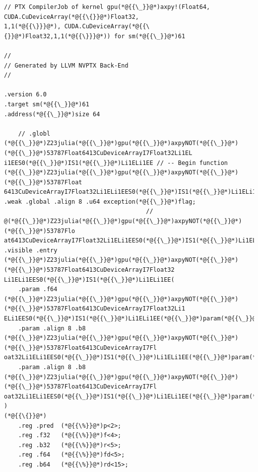 \documentclass[12pt,a4paper]{article}
\begin{document}
\begin{lstlisting}
// PTX CompilerJob of kernel gpu(*@{{\_}}@*)axpy!(Float64, CUDA.CuDeviceArray(*@{{\{}}@*)Float32,
1,1(*@{{\}}}@*), CUDA.CuDeviceArray(*@{{\{}}@*)Float32,1,1(*@{{\}}}@*)) for sm(*@{{\_}}@*)61

//
// Generated by LLVM NVPTX Back-End
//

.version 6.0
.target sm(*@{{\_}}@*)61
.address(*@{{\_}}@*)size 64

	// .globl	(*@{{\_}}@*)Z23julia(*@{{\_}}@*)gpu(*@{{\_}}@*)axpyNOT(*@{{\_}}@*)(*@{{\_}}@*)53787Float6413CuDeviceArrayI7Float32Li1EL
i1EES0(*@{{\_}}@*)IS1(*@{{\_}}@*)Li1ELi1EE // -- Begin function (*@{{\_}}@*)Z23julia(*@{{\_}}@*)gpu(*@{{\_}}@*)axpyNOT(*@{{\_}}@*)(*@{{\_}}@*)53787Float
6413CuDeviceArrayI7Float32Li1ELi1EES0(*@{{\_}}@*)IS1(*@{{\_}}@*)Li1ELi1EE
.weak .global .align 8 .u64 exception(*@{{\_}}@*)flag;
                                        // @(*@{{\_}}@*)Z23julia(*@{{\_}}@*)gpu(*@{{\_}}@*)axpyNOT(*@{{\_}}@*)(*@{{\_}}@*)53787Flo
at6413CuDeviceArrayI7Float32Li1ELi1EES0(*@{{\_}}@*)IS1(*@{{\_}}@*)Li1ELi1EE
.visible .entry (*@{{\_}}@*)Z23julia(*@{{\_}}@*)gpu(*@{{\_}}@*)axpyNOT(*@{{\_}}@*)(*@{{\_}}@*)53787Float6413CuDeviceArrayI7Float32
Li1ELi1EES0(*@{{\_}}@*)IS1(*@{{\_}}@*)Li1ELi1EE(
	.param .f64 (*@{{\_}}@*)Z23julia(*@{{\_}}@*)gpu(*@{{\_}}@*)axpyNOT(*@{{\_}}@*)(*@{{\_}}@*)53787Float6413CuDeviceArrayI7Float32Li1
ELi1EES0(*@{{\_}}@*)IS1(*@{{\_}}@*)Li1ELi1EE(*@{{\_}}@*)param(*@{{\_}}@*)0,
	.param .align 8 .b8 (*@{{\_}}@*)Z23julia(*@{{\_}}@*)gpu(*@{{\_}}@*)axpyNOT(*@{{\_}}@*)(*@{{\_}}@*)53787Float6413CuDeviceArrayI7Fl
oat32Li1ELi1EES0(*@{{\_}}@*)IS1(*@{{\_}}@*)Li1ELi1EE(*@{{\_}}@*)param(*@{{\_}}@*)1[16],
	.param .align 8 .b8 (*@{{\_}}@*)Z23julia(*@{{\_}}@*)gpu(*@{{\_}}@*)axpyNOT(*@{{\_}}@*)(*@{{\_}}@*)53787Float6413CuDeviceArrayI7Fl
oat32Li1ELi1EES0(*@{{\_}}@*)IS1(*@{{\_}}@*)Li1ELi1EE(*@{{\_}}@*)param(*@{{\_}}@*)2[16]
)
(*@{{\{}}@*)
	.reg .pred 	(*@{{\%}}@*)p<2>;
	.reg .f32 	(*@{{\%}}@*)f<4>;
	.reg .b32 	(*@{{\%}}@*)r<5>;
	.reg .f64 	(*@{{\%}}@*)fd<5>;
	.reg .b64 	(*@{{\%}}@*)rd<15>;


\end{lstlisting}
\end{document}
